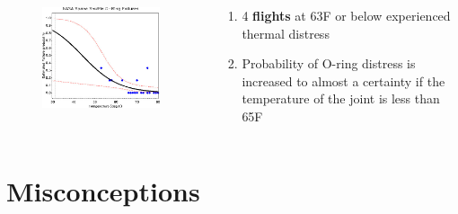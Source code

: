 \documentclass[aspectratio=1610,pdftex,dvipsnames,compress,xcolor={dvipsnames}]{beamer}
\begin{document}
\begin{frame}{}
    \begin{columns}[c]

        \begin{column}{0.65\textwidth}
            \begin{figure}
                \centering
                \includegraphics[width=0.95\textwidth]{challenger.prob.jpg}
            \end{figure}
        \end{column}

        \begin{column}{0.35\textwidth}
            \begin{enumerate}[series=outerlist,topsep=0pt,itemsep=15pt,leftmargin=*,label=(\arabic*)]
                \item[]4 \textbf{flights} at 63\degree F or below experienced thermal distress
                \item[]Probability of O-ring distress is increased to almost a certainty if the temperature of the joint is less than 65\degree F
            \end{enumerate}
        \end{column}

    \end{columns}
\end{frame}


\section{Misconceptions}
\end{document}
